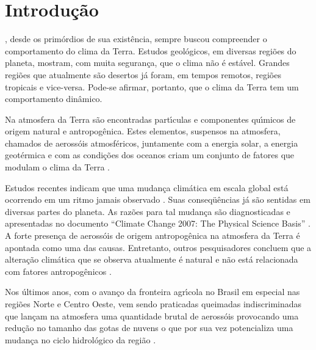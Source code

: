 \chapter{Introdu\c{c}\~{a}o}
\label{cap:introducao}

, desde os prim\'{o}rdios de sua exist\^{e}ncia, sempre buscou
compreender o comportamento do clima da Terra. Estudos geol\'{o}gicos,
em diversas regi\~{o}es do planeta, mostram, com muita seguran\c{c}a, que o
clima n\~{a}o \'{e} est\'{a}vel. Grandes regi\~{o}es que atualmente s\~{a}o desertos j\'{a}
foram, em tempos remotos, regi\~{o}es tropicais e vice-versa. Pode-se
afirmar, portanto, que o clima da Terra tem um comportamento
din\^{a}mico.

Na atmosfera da Terra s\~{a}o encontradas part\'{\i}culas e
componentes qu\'{\i}micos de origem natural e antropog\^{e}nica. Estes
elementos, suspensos na atmosfera, chamados de aeross\'{o}is
atmosf\'{e}ricos, juntamente com a energia solar, a energia geot\'{e}rmica e
com as condi\c{c}\~{o}es dos oceanos criam um conjunto de fatores que
modulam o clima da Terra \cite{Meteorologia,Roberts}.

Estudos recentes indicam que uma mudan\c{c}a clim\'{a}tica em escala global
est\'{a} ocorrendo em um ritmo jamais observado \cite{scott}. Suas conseq\"{u}\^{e}ncias j\'{a}
s\~{a}o sentidas em diversas partes do planeta.  As raz\~{o}es para tal
mudan\c{c}a s\~{a}o diagnosticadas e apresentadas no documento ``Climate
Change 2007: The Physical Science Basis'' \cite{IPCC}. A forte
presen\c{c}a de aeross\'{o}is de origem antropog\^{e}nica na atmosfera da Terra
\'{e} apontada como uma das causas. Entretanto, outros
pesquisadores concluem que a altera\c{c}\~{a}o clim\'{a}tica
que se observa atualmente \'{e} natural e n\~{a}o est\'{a} relacionada com
fatores antropog\^{e}nicos \cite{Alexander,Marcel}.

Nos \'{u}ltimos anos, com o avan\c{c}o da fronteira agr\'{\i}cola no Brasil em
especial nas regi\~{o}es Norte e Centro Oeste, vem sendo praticadas
queimadas indiscriminadas que lan\c{c}am na atmosfera uma quantidade
brutal de aeross\'{o}is provocando uma redu\c{c}\~{a}o no tamanho das gotas de
nuvens o que por sua vez potencializa uma mudan\c{c}a no ciclo
hidrol\'{o}gico da regi\~{a}o \cite{Andreae,Debry}.

